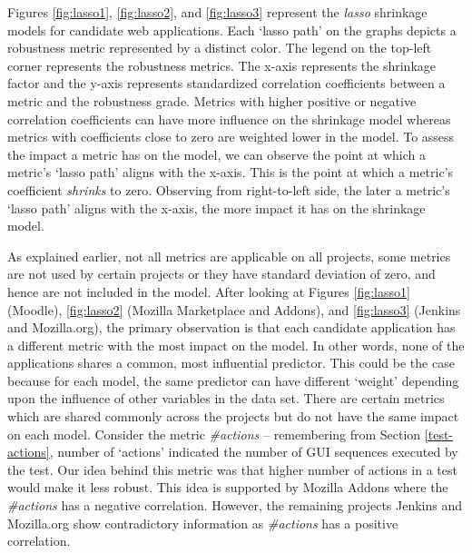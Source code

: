 Figures \ref{fig:lasso1}, \ref{fig:lasso2}, and \ref{fig:lasso3} represent the \textit{lasso} shrinkage models for candidate web applications. Each `lasso path' on the graphs depicts a robustness metric represented by a distinct color. The legend on the top-left corner represents the robustness metrics. The x-axis represents the shrinkage factor and the y-axis represents standardized correlation coefficients between a metric and the robustness grade. Metrics with higher positive or negative correlation coefficients can have more influence on the shrinkage model whereas metrics with coefficients close to zero are weighted lower in the model. To assess the impact a metric has on the model, we can observe the point at which a metric's `lasso path' aligns with the x-axis. This is the point at which a metric's coefficient \textit{shrinks} to zero. Observing from right-to-left side, the later a metric's `lasso path' aligns with the x-axis, the more impact it has on the shrinkage model. 

As explained earlier, not all metrics are applicable on all projects, some metrics are not used by certain projects or they have standard deviation of zero, and hence are not included in the model. After looking at Figures \ref{fig:lasso1} (Moodle), \ref{fig:lasso2} (Mozilla Marketplace and Addons), and \ref{fig:lasso3} (Jenkins and Mozilla.org), the primary observation is that each candidate application has a different metric with the most impact on the model. In other words, none of the applications shares a common, most influential predictor. This could be the case because for each model, the same predictor can have different `weight' depending upon the influence of other variables in the data set. There are certain metrics which are shared commonly across the projects but do not have the same impact on each model. Consider the metric \textit{\#actions} --  remembering from Section \ref{test-actions}, number of `actions' indicated the number of GUI sequences executed by the test. Our idea behind this metric was that higher number of actions in a test would make it less robust. This idea is supported by Mozilla Addons where the \textit{\#actions} has a negative correlation. However, the remaining projects Jenkins and Mozilla.org show contradictory information as  \textit{\#actions} has a positive correlation. 

